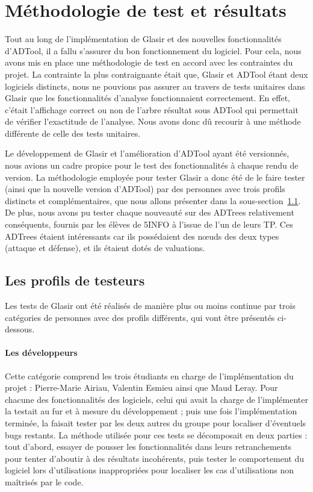 \section{Méthodologie de test et résultats}
\label{sec:cr_tests}

Tout au long de l'implémentation de Glasir et des nouvelles fonctionnalités d'ADTool, il a fallu s'assurer du bon fonctionnement du logiciel. Pour cela, nous avons mis en place une méthodologie de test en accord avec les contraintes du projet. La contrainte la plus contraignante était que, Glasir et ADTool étant deux logiciels distincts, nous ne pouvions pas assurer au travers de tests unitaires dans Glasir que les fonctionnalités d'analyse fonctionnaient correctement. En effet, c'était l'affichage correct ou non de l'arbre résultat sous ADTool qui permettait de vérifier l'exactitude de l'analyse. Nous avons donc dû recourir à une méthode différente de celle des tests unitaires.

Le développement de Glasir et l'amélioration d'ADTool ayant été versionnés, nous avions un cadre propice pour le test des fonctionnalités à chaque rendu de version. La méthodologie employée pour tester Glasir a donc été de le faire tester (ainsi que la nouvelle version d'ADTool) par des personnes avec trois profils distincts et complémentaires, que nous allons présenter dans la {\sc sous-section}~\ref{subsec:testeurs}. De plus, nous avons pu tester chaque nouveauté sur des ADTrees relativement conséquents, fournis par les élèves de 5INFO à l'issue de l'un de leurs TP. Ces ADTrees étaient intéressants car ils possédaient des n\oe{}uds des deux types (attaque et défense), et ils étaient dotés de valuations.

\subsection{Les profils de testeurs}
\label{subsec:testeurs}

Les tests de Glasir ont été réalisés de manière plus ou moins continue par trois catégories de personnes avec des profils différents, qui vont être présentés ci-dessous.

\paragraph{Les développeurs} Cette catégorie comprend les trois étudiants en charge de l'implémentation du projet : Pierre-Marie {\sc Airiau}, Valentin {\sc Esmieu} ainsi que Maud {\sc Leray}. Pour chacune des fonctionnalités des logiciels, celui qui avait la charge de l'implémenter la testait au fur et à mesure du développement ; puis une fois l'implémentation terminée, la faisait tester par les deux autres du groupe pour localiser d'éventuels \og bugs \fg{} restants. La méthode utilisée pour ces tests se décomposait en deux parties : tout d'abord, essayer de pousser les fonctionnalités dans leurs retranchements pour tenter d'aboutir à des résultats incohérents, puis tester le comportement du logiciel lors d'utilisations inappropriées pour localiser les cas d'utilisations non maîtrisés par le code.

